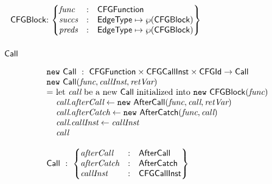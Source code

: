 \hspace*{-2em}
$\begin{array}{@{~}r@{~}l@{}l@{~}l}
& \CFGBlock & : &
\begin{Bmatrix*}[l]
\emph{func} & : & \CFGFunction \\
\emph{succs} & : & \EdgeType \mapsto \powerset{\CFGBlock} \\
\emph{preds} & : & \EdgeType \mapsto \powerset{\CFGBlock} \\
\end{Bmatrix*}\\
\end{array}
$

\subsubsection{$\mbox{\textsf{Call}}$}
\[
\begin{array}{l@{}l@{~}l}
\lefteqn{\new \ \Call \ : \ \CFGFunction \times \CFGCallInst \times \CFGId \rightarrow \Call} \\
\lefteqn{\new\ \Call(\emph{func}, \emph{callInst}, \emph{retVar})}\\
& = & \text{let } \emph{call} \text{ be a new } \Call \text{ initialized into } \new\ \CFGBlock(\emph{func})\\
& & \emph{call}.\emph{afterCall} \leftarrow \new\ \AfterCall(\emph{func}, \emph{call}, \emph{retVar})\\
& & \emph{call}.\emph{afterCatch} \leftarrow \new\ \AfterCatch(\emph{func}, \emph{call})\\
& & \emph{call}.\emph{callInst} \leftarrow \emph{callInst}\\
& & \emph{call}\\\\
\lefteqn{ \Call \ : \
\begin{Bmatrix*}[l]
\emph{afterCall} & : & \AfterCall\\
\emph{afterCatch} & : & \AfterCatch\\
\emph{callInst} & : & \CFGCallInst\\
\end{Bmatrix*}
}
\end{array}
\]

